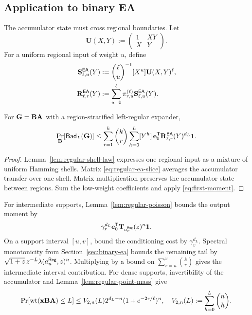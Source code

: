 \subsection{Application to binary EA}

The accumulator state must cross regional boundaries.  Let
\begin{equation}
 \mathbf U(X,Y):=
 \begin{pmatrix}1&XY\\X&Y\end{pmatrix}.
 \label{eq:regular-ea-input-transfer}
\end{equation}
For a uniform regional input of weight $u$, define
\begin{align}
 \mathbf S^{\mathsf{EA}}_{\ell,u}(Y)
 &:=\binom{\ell}{u}^{-1}[X^u]\mathbf U(X,Y)^\ell,
 \label{eq:regular-ea-slice}\\
 \mathbf R^{\mathsf{EA}}_{\ell,r}(Y)
 &:=\sum_{u=0}^{\ell}\pi^{(\ell)}_{r,u}
 \mathbf S^{\mathsf{EA}}_{\ell,u}(Y).
 \label{eq:regular-ea-region}
\end{align}

\begin{theorem}
\label{thm:regular-ea-first-moment}
For $\mathbf G=\mathbf B\mathbf A$ with a region-stratified left-regular expander,
\begin{equation}
 \Pr_{\mathbf B}[\mathsf{Bad}_L(\mathbf G)]\leq
 \sum_{r=1}^{k}\binom{k}{r}\sum_{h=0}^{L}[Y^h]\,
 \mathbf e_0^{\mathsf T}
 \mathbf R^{\mathsf{EA}}_{\ell,r}(Y)^{d_L}\mathbf 1.
 \label{eq:regular-ea-first-moment}
\end{equation}
\end{theorem}

\begin{proof}
Lemma~\ref{lem:regular-shell-law} expresses one regional input as a mixture of
uniform Hamming shells.  Matrix \eqref{eq:regular-ea-slice} averages the
accumulator transfer over one shell.  Matrix multiplication preserves the
accumulator state between regions.  Sum the low-weight coefficients and apply
\eqref{eq:first-moment}.
\end{proof}

For intermediate supports, Lemma~\ref{lem:regular-poisson} bounds the output
moment by
\begin{equation}
 \gamma_r^{d_L}\mathbf e_0^{\mathsf T}
 \mathbf T_{a^{\mathsf{Reg}}_r}(z)^n\mathbf 1.
 \label{eq:regular-ea-poisson-moment}
\end{equation}
On a support interval $[u,v]$, bound the conditioning cost by
$\gamma_v^{d_L}$.  Spectral monotonicity from
Section~\ref{sec:binary-ea} bounds the remaining tail by
$\sqrt{1+z}\,z^{-L}\lambda(a^{\mathsf{Reg}}_u,z)^n$.
Multiplying by a bound on $\sum_{r=u}^{v}\binom{k}{r}$ gives the
intermediate interval contribution.
For dense supports, invertibility of the accumulator and
Lemma~\ref{lem:regular-point-mass} give
\begin{equation}
 \Pr[\operatorname{wt}(\mathbf x\mathbf B\mathbf A)\leq L]
 \leq V_{2,n}(L)2^{d_L-n}(1+e^{-2r/\ell})^n,
 \quad
 V_{2,n}(L):=\sum_{h=0}^{L}\binom nh.
 \label{eq:regular-ea-dense}
\end{equation}

